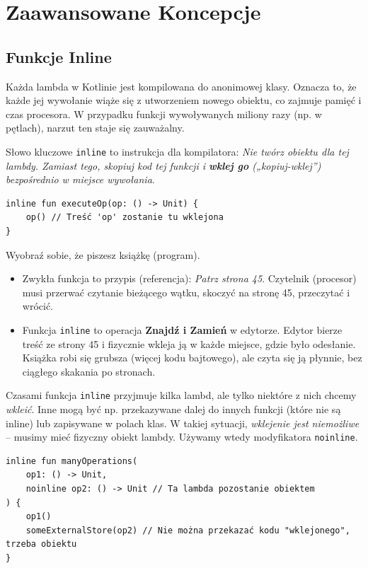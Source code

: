 \section{Zaawansowane Koncepcje}

\subsection{Funkcje Inline}
Każda lambda w Kotlinie jest kompilowana do anonimowej klasy. Oznacza to, że każde jej wywołanie wiąże się z utworzeniem nowego obiektu, co zajmuje pamięć i czas procesora. W przypadku funkcji wywoływanych miliony razy (np. w pętlach), narzut ten staje się zauważalny.

Słowo kluczowe \texttt{inline} to instrukcja dla kompilatora: \textit{Nie twórz obiektu dla tej lambdy. Zamiast tego, skopiuj kod tej funkcji i \textbf{wklej go} („kopiuj-wklej”) bezpośrednio w miejsce wywołania}.

\begin{verbatim}
inline fun executeOp(op: () -> Unit) {
    op() // Treść 'op' zostanie tu wklejona
}
\end{verbatim}

Wyobraź sobie, że piszesz książkę (program).
\begin{itemize}
    \item Zwykła funkcja to przypis (referencja): \textit{Patrz strona 45}. Czytelnik (procesor) musi przerwać czytanie bieżącego wątku, skoczyć na stronę 45, przeczytać i wrócić.
    \item Funkcja \texttt{inline} to operacja \textbf{Znajdź i Zamień} w edytorze. Edytor bierze treść ze strony 45 i fizycznie wkleja ją w każde miejsce, gdzie było odesłanie. Książka robi się grubsza (więcej kodu bajtowego), ale czyta się ją płynnie, bez ciągłego skakania po stronach.
\end{itemize}

 Czasami funkcja \texttt{inline} przyjmuje kilka lambd, ale tylko niektóre z nich chcemy \textit{wkleić}. Inne mogą być np. przekazywane dalej do innych funkcji (które nie są inline) lub zapisywane w polach klas. W takiej sytuacji, \textit{wklejenie jest niemożliwe} – musimy mieć fizyczny obiekt lambdy. Używamy wtedy modyfikatora \texttt{noinline}.

\begin{verbatim}
inline fun manyOperations(
    op1: () -> Unit,
    noinline op2: () -> Unit // Ta lambda pozostanie obiektem
) {
    op1()
    someExternalStore(op2) // Nie można przekazać kodu "wklejonego", trzeba obiektu
}
\end{verbatim}

